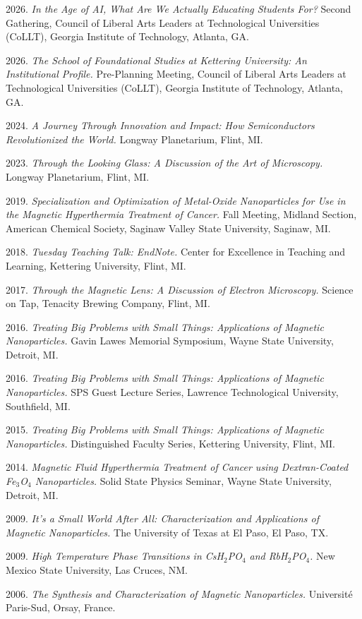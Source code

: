 \documentclass[10pt]{article}
\begin{document}
\begin{reflist}
\item 2026. \textit{In the Age of AI, What Are We Actually Educating Students For?} Second Gathering, Council of Liberal Arts Leaders at Technological Universities (CoLLT), Georgia Institute of Technology, Atlanta, GA.
\item 2026. \textit{The School of Foundational Studies at Kettering University: An Institutional Profile.} Pre-Planning Meeting, Council of Liberal Arts Leaders at Technological Universities (CoLLT), Georgia Institute of Technology, Atlanta, GA.
\item 2024. \textit{A Journey Through Innovation and Impact: How Semiconductors Revolutionized the World.} Longway Planetarium, Flint, MI.
\item 2023. \textit{Through the Looking Glass: A Discussion of the Art of Microscopy.} Longway Planetarium, Flint, MI.
\item 2019. \textit{Specialization and Optimization of Metal-Oxide Nanoparticles for Use in the Magnetic Hyperthermia Treatment of Cancer.} Fall Meeting, Midland Section, American Chemical Society, Saginaw Valley State University, Saginaw, MI.
\item 2018. \textit{Tuesday Teaching Talk: EndNote.} Center for Excellence in Teaching and Learning, Kettering University, Flint, MI.
\item 2017. \textit{Through the Magnetic Lens: A Discussion of Electron Microscopy.} Science on Tap, Tenacity Brewing Company, Flint, MI.
\item 2016. \textit{Treating Big Problems with Small Things: Applications of Magnetic Nanoparticles.} Gavin Lawes Memorial Symposium, Wayne State University, Detroit, MI.
\item 2016. \textit{Treating Big Problems with Small Things: Applications of Magnetic Nanoparticles.} SPS Guest Lecture Series, Lawrence Technological University, Southfield, MI.
\item 2015. \textit{Treating Big Problems with Small Things: Applications of Magnetic Nanoparticles.} Distinguished Faculty Series, Kettering University, Flint, MI.
\item 2014. \textit{Magnetic Fluid Hyperthermia Treatment of Cancer using Dextran-Coated Fe$_3$O$_4$ Nanoparticles.} Solid State Physics Seminar, Wayne State University, Detroit, MI.
\item 2009. \textit{It's a Small World After All: Characterization and Applications of Magnetic Nanoparticles.} The University of Texas at El Paso, El Paso, TX.
\item 2009. \textit{High Temperature Phase Transitions in CsH$_2$PO$_4$ and RbH$_2$PO$_4$.} New Mexico State University, Las Cruces, NM.
\item 2006. \textit{The Synthesis and Characterization of Magnetic Nanoparticles.} Universit\'e Paris-Sud, Orsay, France.
\end{reflist}
\end{document}

